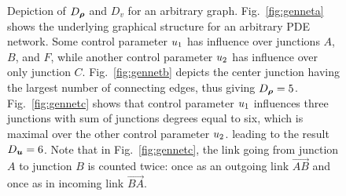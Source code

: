\begin{figure}
\begin{centering}
\par\end{centering}

\caption{Depiction of $D_{\state}$ and $D_{v}$ for an arbitrary graph. Fig.~\ref{fig:genneta}
shows the underlying graphical structure for an arbitrary PDE network.
Some control parameter $u_{1}$ has influence over junctions
$A$, $B$, and $F$, while another control parameter $u_{2}$
has influence over only junction $C$. Fig.~\ref{fig:gennetb}
depicts the center junction having the largest number of connecting
edges, thus giving $D_{\state}=5$. Fig.~\ref{fig:gennetc} shows
that control parameter $u_{1}$ influences three junctions with
sum of junctions degrees equal to six, which is maximal over the other
control parameter $u_{2}$. leading to the result $D_{\control}=6$.
Note that in Fig.~\ref{fig:gennetc}, the link going from junction
$A$ to junction $B$ is counted twice: once as an outgoing link $\vec{AB}$
and once as in incoming link $\vec{BA}$.\label{fig:Depicting--and}}
\end{figure}

